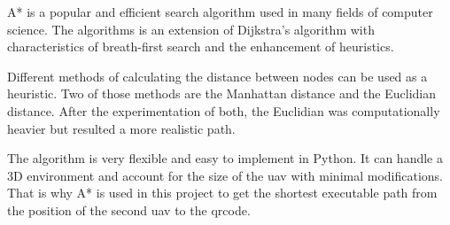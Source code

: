 A* is a popular and efficient search algorithm used in many fields of computer science. The algorithms is an extension of Dijkstra's algorithm with characteristics of breath-first search and the enhancement of heuristics. \cite{a_star_brilliant}

Different methods of calculating the distance between nodes can be used as a heuristic. Two of those methods are the Manhattan distance and the Euclidian distance. After the experimentation of both, the Euclidian was computationally heavier but resulted a more realistic path.

The algorithm is very flexible and easy to implement in Python. It can handle a 3D environment and account for the size of the \acs{uav} with minimal modifications. That is why A* is used in this project to get the shortest executable path from the position of the second \acs{uav} to the \acs{qrcode}.